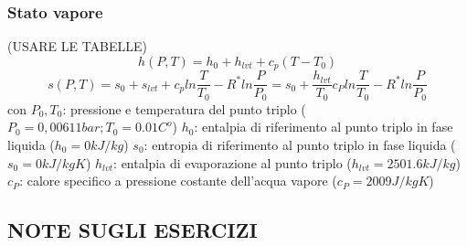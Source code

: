 \subsubsection{Stato vapore}
(USARE LE TABELLE)
\[
    h(P,T) = h_0 + h_{lvt} + c_p (T-T_0)
\]
\[
    s(P,T) = s_0 + s_{lvt} + c_p ln \frac{T}{T_0} - R^* ln \frac{P}{P_0} = s_0 + \frac{h_{lvt}}{T_0} c_P ln \frac{T}{T_0}- R^* ln \frac{P}{P_0}
\]
con \newline
$P_0, T_0$: pressione e temperatura del punto triplo ($P_0 = 0,00611 bar ; T_0 = 0.01 C^o$)\newline
$h_0$: entalpia di riferimento al punto triplo in fase liquida ($h_0 = 0 kJ/kg$)\newline
$s_0$: entropia di riferimento al punto triplo in fase liquida ($s_0 = 0kJ/kgK$)\newline
$h_{lvt}$: entalpia di evaporazione al punto triplo ($h_{lvt} = 2501.6 kJ/kg$)\newline
$c_P$: calore specifico a pressione costante dell'acqua vapore ($c_P = 2009 J/kgK$)
\subsection{NOTE SUGLI ESERCIZI}
